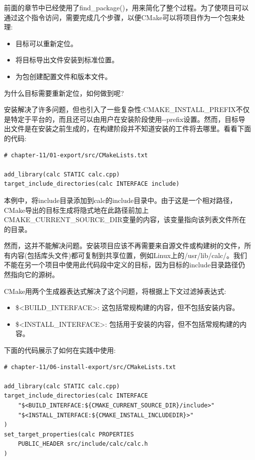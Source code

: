 
前面的章节中已经使用了find\_package()，用来简化了整个过程。为了使项目可以通过这个指令访问，需要完成几个步骤，以便CMake可以将项目作为一个包来处理:

\begin{itemize}
\item 
目标可以重新定位。

\item 
将目标导出文件安装到标准位置。

\item 
为包创建配置文件和版本文件。
\end{itemize}

为什么目标需要重新定位，如何做到呢?


安装解决了许多问题，但也引入了一些复杂性:CMAKE\_INSTALL\_PREFIX不仅是特定于平台的，而且还可以由用户在安装阶段使用-{}-prefix设置。然而，目标导出文件是在安装之前生成的，在构建阶段并不知道安装的工件将去哪里。看看下面的代码:

\begin{lstlisting}[style=styleCMake]
# chapter-11/01-export/src/CMakeLists.txt

add_library(calc STATIC calc.cpp)
target_include_directories(calc INTERFACE include)
\end{lstlisting}

本例中，将include目录添加到calc的include目录中。由于这是一个相对路径，CMake导出的目标生成将隐式地在此路径前加上CMAKE\_CURRENT\_SOURCE\_DIR变量的内容，该变量指向该列表文件所在的目录。

然而，这并不能解决问题。安装项目应该不再需要来自源文件或构建树的文件，所有内容(包括库头文件)都可复制到共享位置，例如Linux上的/usr/lib/calc/。我们不能在另一个项目中使用此代码段中定义的目标，因为目标的include目录路径仍然指向它的源树。

CMake用两个生成器表达式解决了这个问题，将根据上下文过滤掉表达式:

\begin{itemize}
\item 
\$<BUILD\_INTERFACE>: 这包括常规构建的内容，但不包括安装内容。

\item 
\$<INSTALL\_INTERFACE>: 包括用于安装的内容，但不包括常规构建的内容。
\end{itemize}

下面的代码展示了如何在实践中使用:

\begin{lstlisting}[style=styleCMake]
# chapter-11/06-install-export/src/CMakeLists.txt

add_library(calc STATIC calc.cpp)
target_include_directories(calc INTERFACE
	"$<BUILD_INTERFACE:${CMAKE_CURRENT_SOURCE_DIR}/include>"
	"$<INSTALL_INTERFACE:${CMAKE_INSTALL_INCLUDEDIR}>"
)
set_target_properties(calc PROPERTIES
	PUBLIC_HEADER src/include/calc/calc.h
)
\end{lstlisting}

